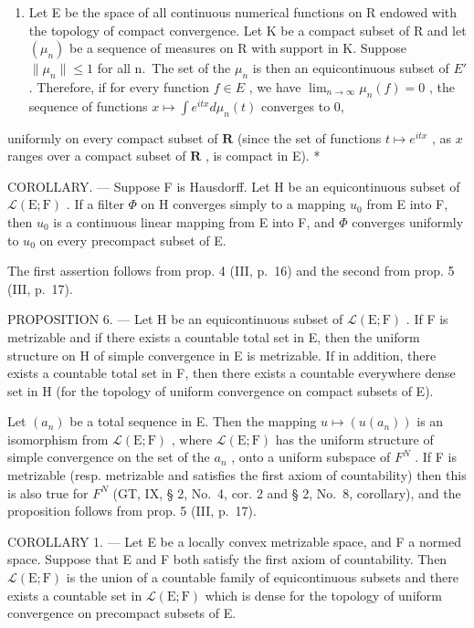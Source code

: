 \begin{enumerate}
\def\labelenumi{\arabic{enumi})}
\setcounter{enumi}{1}
\tightlist
\item
  Let E be the space of all continuous numerical functions on R endowed with the topology of compact convergence. Let K be a compact subset of R and let \((\mu_{n})\) be a sequence of measures on R with support in K. Suppose \(\|\mu_{n}\|\leqslant1\) for all n.~The set of the \(\mu_{n}\) is then an equicontinuous subset of \(E'\) . Therefore, if for every function \(f\in E\) , we have \(\lim_{n\to\infty}\mu_{n}(f)=0\) , the sequence of functions \(x\mapsto\int e^{itx}d\mu_{n}(t)\) converges to 0,
\end{enumerate}

uniformly on every compact subset of \(\mathbf{R}\) (since the set of functions \(t \mapsto e^{itx}\) , as \(x\) ranges over a compact subset of \(\mathbf{R}\) , is compact in E). *

COROLLARY. --- Suppose F is Hausdorff. Let H be an equicontinuous subset of \(\mathcal{L}(\mathrm{E};\mathrm{F})\) . If a filter \(\Phi\) on H converges simply to a mapping \(u_{0}\) from E into F, then \(u_{0}\) is a continuous linear mapping from E into F, and \(\Phi\) converges uniformly to \(u_{0}\) on every precompact subset of E.

The first assertion follows from prop. 4 (III, p.~16) and the second from prop. 5 (III, p.~17).

PROPOSITION 6. --- Let H be an equicontinuous subset of \(\mathcal{L}(\mathrm{E};\mathrm{F})\) . If F is metrizable and if there exists a countable total set in E, then the uniform structure on H of simple convergence in E is metrizable. If in addition, there exists a countable total set in F, then there exists a countable everywhere dense set in H (for the topology of uniform convergence on compact subsets of E).

Let \((a_{n})\) be a total sequence in E. Then the mapping \(u \mapsto (u(a_{n}))\) is an isomorphism from \(\mathcal{L}(\mathrm{E};\mathrm{F})\) , where \(\mathcal{L}(\mathrm{E};\mathrm{F})\) has the uniform structure of simple convergence on the set of the \(a_{n}\) , onto a uniform subspace of \(F^{N}\) . If F is metrizable (resp. metrizable and satisfies the first axiom of countability) then this is also true for \(F^{N}\) (GT, IX, § 2, No.~4, cor. 2 and § 2, No.~8, corollary), and the proposition follows from prop. 5 (III, p.~17).

COROLLARY 1. --- Let E be a locally convex metrizable space, and F a normed space. Suppose that E and F both satisfy the first axiom of countability. Then \(\mathcal{L}(\mathrm{E};\mathrm{F})\) is the union of a countable family of equicontinuous subsets and there exists a countable set in \(\mathcal{L}(\mathrm{E};\mathrm{F})\) which is dense for the topology of uniform convergence on precompact subsets of E.

